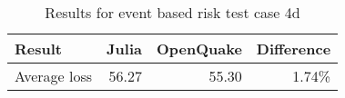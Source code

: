 \begin{table}[htbp]

\centering
\begin{tabular}{ l r r r }

\hline
\rowcolor{anti-flashwhite}
\bf{Result} & \bf{Julia} & \bf{OpenQuake} & \bf{Difference}\\
\hline
Average loss & 56.27 & 55.30 & 1.74\% \\
\hline
\end{tabular}

\caption{Results for event based risk test case 4d}
\label{tab:result-ebr-4d}
\end{table}